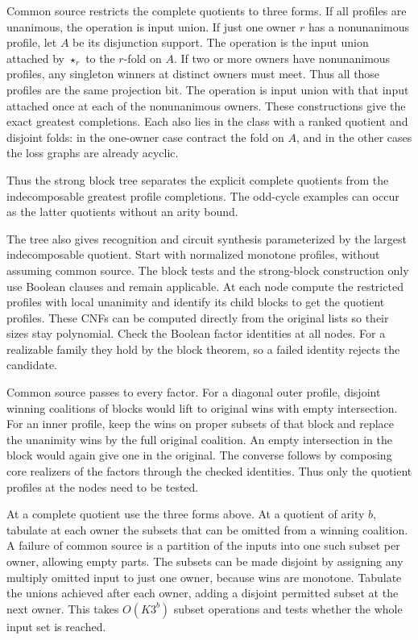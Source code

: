 Common source restricts the complete quotients to
three forms. If all profiles are unanimous, the
operation is input union. If just one owner $r$ has
a nonunanimous profile, let $A$ be its disjunction
support. The operation is the input union attached
by $\star_r$ to the $r$-fold on $A$. If two or more
owners have nonunanimous profiles, any singleton
winners at distinct owners must meet. Thus all those
profiles are the same projection bit. The operation
is input union with that input attached once at
each of the nonunanimous owners. These constructions
give the exact greatest completions. Each also lies
in the class with a ranked quotient and disjoint
folds: in the one-owner case contract the fold on
$A$, and in the other cases the loss graphs are
already acyclic.

Thus the strong block tree separates the explicit
complete quotients from the indecomposable greatest
profile completions. The odd-cycle examples can
occur as the latter quotients without an arity bound.

The tree also gives recognition and circuit synthesis
parameterized by the largest indecomposable quotient.
Start with normalized monotone profiles, without
assuming common source. The block tests and the
strong-block construction only use Boolean clauses
and remain applicable. At each node compute the
restricted profiles with local unanimity and identify
its child blocks to get the quotient profiles. These
CNFs can be computed directly from the original lists
so their sizes stay polynomial. Check the Boolean
factor identities at all nodes. For a realizable
family they hold by the block theorem, so a failed
identity rejects the candidate.

Common source passes to every factor. For a diagonal
outer profile, disjoint winning coalitions of blocks
would lift to original wins with empty intersection.
For an inner profile, keep the wins on proper subsets
of that block and replace the unanimity wins by the
full original coalition. An empty intersection in
the block would again give one in the original. The
converse follows by composing core realizers of the
factors through the checked identities. Thus only
the quotient profiles at the nodes need to be tested.

At a complete quotient use the three forms above.
At a quotient of arity $b$, tabulate at each owner
the subsets that can be omitted from a winning
coalition. A failure of common source is a partition
of the inputs into one such subset per owner,
allowing empty parts. The subsets can be made
disjoint by assigning any multiply omitted input
to just one owner, because wins are monotone.
Tabulate the unions achieved after each owner,
adding a disjoint permitted subset at the next
owner. This takes $O(K3^b)$ subset operations and
tests whether the whole input set is reached.

